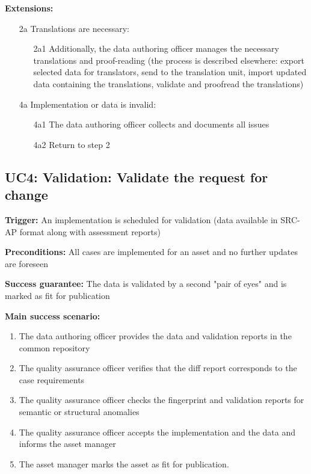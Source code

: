 	\textbf{Extensions:}
	\begin{enumerate}
		\item [2a] Translations are necessary:
		\begin{enumerate}
			\item [2a1] Additionally, the data authoring officer manages the necessary translations and proof-reading (the process is described elsewhere: export selected data for translators, send to the translation unit, import updated data containing the translations, validate and proofread the translations)			
		\end{enumerate}
		\item [4a] Implementation or data is invalid:
		\begin{enumerate}
			\item [4a1] The data authoring officer collects and documents all issues 
			\item [4a2] Return to step 2			
		\end{enumerate}
	\end{enumerate}
	
	\subsection{UC4: Validation: Validate the request for change}
	\label{sec:uc4}
	
	\textbf{Trigger:} An implementation is scheduled for validation (data available in SRC-AP format along with assessment reports)
	
	\textbf{Preconditions:} All cases are implemented for an asset and no further updates are foreseen
	
	\textbf{Success guarantee:} The data is validated by a second "pair of eyes" and is marked as fit for publication
	
	\textbf{Main success scenario:} 
	
	\begin{enumerate}
		\item The data authoring officer provides the data and validation reports in the common repository 
		\item The quality assurance officer verifies that the diff report corresponds to the case requirements
		\item The quality assurance officer checks the fingerprint and validation reports for semantic or structural anomalies
		\item The quality assurance officer accepts the implementation and the data and informs the asset manager
		\item The asset manager marks the asset as fit for publication.
		
	\end{enumerate}
	
